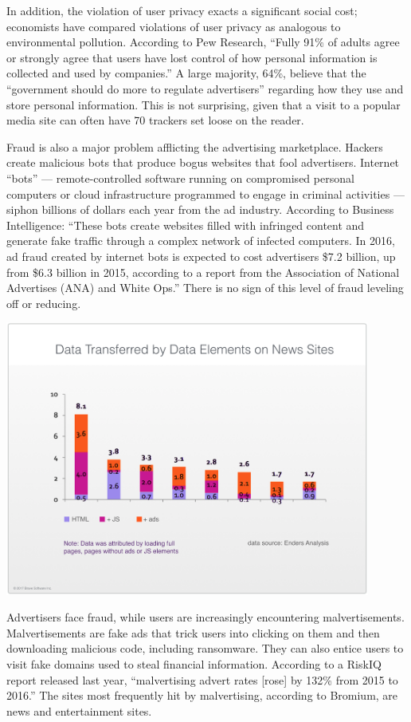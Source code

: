 \documentclass[11pt]{article}
\begin{document}
In addition, the violation of user privacy exacts a significant social cost; economists have compared violations of user privacy as analogous to environmental pollution.\cite{5} According to Pew Research, “Fully 91\% of adults agree or strongly agree that users have lost control of how personal information is collected and used by companies.”\cite{6} A large majority, 64\%, believe that the “government should do more to regulate advertisers” regarding how they use and store personal information. This is not surprising, given that a visit to a popular media site can often have 70 trackers set loose on the reader. 

Fraud is also a major problem afflicting the advertising marketplace. Hackers  create malicious bots that produce bogus websites that fool advertisers. Internet “bots” — remote-controlled software running on compromised personal computers or cloud infrastructure programmed to engage in criminal activities — siphon billions of dollars each year from the ad industry. According to Business Intelligence: “These bots create websites filled with infringed content and generate fake traffic through a complex network of infected computers. In 2016, ad fraud created by internet bots is expected to cost advertisers \$7.2 billion, up from \$6.3 billion in 2015, according to a report from the Association of National Advertises (ANA) and White Ops.”\cite{7} There is no sign of this level of fraud leveling off or reducing. 

\begin{center}
\includegraphics[width=0.9\textwidth]{data_transfer_news_sites.png}
\end{center}

Advertisers face fraud, while users are increasingly encountering malvertisements. Malvertisements are fake ads that trick users into clicking on them and then downloading malicious code, including ransomware. They can also entice users to visit fake domains used to steal financial information. According to a RiskIQ report released last year, “malvertising advert rates [rose] by 132\% from 2015 to 2016.” The sites most frequently hit by malvertising, according to Bromium\cite{8}, are news and entertainment sites. 
\end{document}
